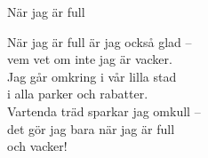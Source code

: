 \begin{song}{När jag är full}
	

	
	När jag är full är jag också glad --\\
	vem vet om inte jag är vacker.\\
	Jag går omkring i vår lilla stad\\
	i alla parker och rabatter.\\
	Vartenda träd sparkar jag omkull --\\
	det gör jag bara när jag är full\\
	och vacker!
	
\end{song}
